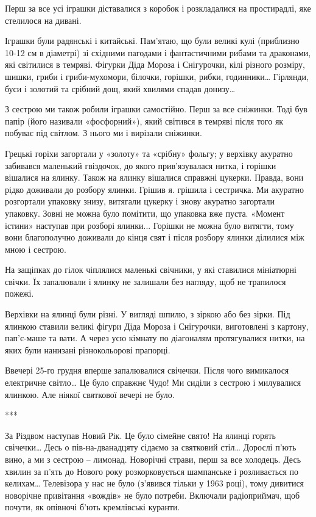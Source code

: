 Перш за все усі іграшки діставалися з коробок і розкладалися на простирадлі,
яке стелилося на дивані. 

Іграшки були радянські і китайські. Пам’ятаю, що були великі кулі (приблизно
10-12 см в діаметрі) зі східними пагодами і фантастичними рибами та драконами,
які світилися в темряві. Фігурки Діда Мороза і Снігурочки, кілі різного
розміру, шишки, гриби і гриби-мухомори, білочки, горішки, рибки, годинники…
Гірлянди, буси і золотий та срібний дощ, який хвилями спадав донизу… 

З сестрою ми також робили іграшки самостійно. Перш за все сніжинки. Тоді був
папір (його називали «фосфорний»), який світився в темряві після того як
побуває під світлом. З нього ми і вирізали сніжинки. 

Грецькі горіхи загортали у «золоту» та «срібну» фольгу; у верхівку акуратно
забивався маленький гвіздочок, до якого прив’язувалася нитка, і горішки
вішалися на ялинку. Також на ялинку вішалися справжні цукерки. Правда, вони
рідко доживали до розбору ялинки. Грішив я. грішила і сестричка. Ми акуратно
розгортали упаковку знизу, витягали цукерку і знову акуратно загортали
упаковку. Зовні не можна було помітити, що упаковка вже пуста. «Момент істини»
наступав при розборі ялинки... Горішки не можна було витягти, тому вони
благополучно доживали до кінця свят і після розбору ялинки ділилися між мною і
сестрою.

На защіпках до гілок чіплялися маленькі свічники, у які ставилися мініатюрні
свічки. Їх запалювали і ялинку не залишали без нагляду, щоб не трапилося
пожежі.

Верхівки на ялинці були різні. У вигляді шпилю, з зіркою або без зірки. Під
ялинкою ставили великі фігури Діда Мороза і Снігурочки, виготовлені з картону,
пап’є-маше та вати. А через усю кімнату по діагоналям протягувалися нитки, на
яких були нанизані різнокольорові прапорці.

Ввечері 25-го грудня вперше запалювалися свічечки. Після чого вимикалося
електричне світло… Це було справжнє Чудо! Ми сиділи з сестрою і милувалися
ялинкою. Але ніякої святкової вечері не було.

***

За Різдвом наступав Новий Рік. Це було сімейне свято! На ялинці горять
свічечки… Десь о пів-на-дванадцяту сідаємо за святковий стіл… Дорослі п’ють
вино, а ми з сестрою – лимонад. Новорічні страви, перш за все холодець. Десь
хвилин за п’ять до Нового року розкорковується шампанське і розливається по
келихам… Телевізора у нас не було (з’явився тільки  у 1963 році), тому дивитися
новорічне привітання «вождів» не було потреби. Включали радіоприймач, щоб
почути, як опівночі б’ють кремлівські куранти. 

